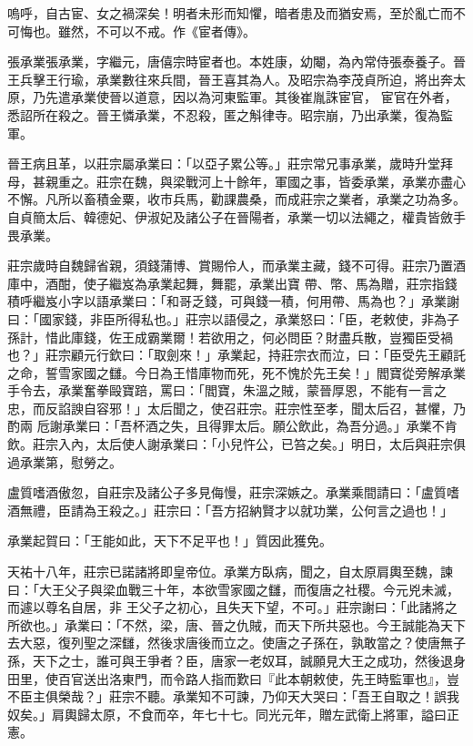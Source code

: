 
\begin{pinyinscope}

 嗚呼，自古宦、女之禍深矣！明者未形而知懼，暗者患及而猶安焉，至於亂亡而不可悔也。雖然，不可以不戒。作《宦者傳》。



 張承業張承業，字繼元，唐僖宗時宦者也。本姓康，幼閹，為內常侍張泰養子。晉王兵擊王行瑜，承業數往來兵間，晉王喜其為人。及昭宗為李茂貞所迫，將出奔太原，乃先遣承業使晉以道意，因以為河東監軍。其後崔胤誅宦官，
 宦官在外者，悉詔所在殺之。晉王憐承業，不忍殺，匿之斛律寺。昭宗崩，乃出承業，復為監軍。



 晉王病且革，以莊宗屬承業曰：「以亞子累公等。」莊宗常兄事承業，歲時升堂拜母，甚親重之。莊宗在魏，與梁戰河上十餘年，軍國之事，皆委承業，承業亦盡心不懈。凡所以畜積金粟，收市兵馬，勸課農桑，而成莊宗之業者，承業之功為多。自貞簡太后、韓德妃、伊淑妃及諸公子在晉陽者，承業一切以法繩之，權貴皆斂手畏承業。



 莊宗歲時自魏歸省親，須錢蒲博、賞賜伶人，而承業主藏，錢不可得。莊宗乃置酒庫中，酒酣，使子繼岌為承業起舞，舞罷，承業出寶
 帶、幣、馬為贈，莊宗指錢積呼繼岌小字以語承業曰：「和哥乏錢，可與錢一積，何用帶、馬為也？」承業謝曰：「國家錢，非臣所得私也。」莊宗以語侵之，承業怒曰：「臣，老敕使，非為子孫計，惜此庫錢，佐王成霸業爾！若欲用之，何必問臣？財盡兵散，豈獨臣受禍也？」莊宗顧元行欽曰：「取劍來！」承業起，持莊宗衣而泣，曰：「臣受先王顧託之命，誓雪家國之讎。今日為王惜庫物而死，死不愧於先王矣！」閻寶從旁解承業手令去，承業奮拳毆寶踣，罵曰：「閻寶，朱溫之賊，蒙晉厚恩，不能有一言之忠，而反諂諛自容邪！」太后聞之，使召莊宗。莊宗性至孝，聞太后召，甚懼，乃酌兩
 卮謝承業曰：「吾杯酒之失，且得罪太后。願公飲此，為吾分過。」承業不肯飲。莊宗入內，太后使人謝承業曰：「小兒忤公，已笞之矣。」明日，太后與莊宗俱過承業第，慰勞之。



 盧質嗜酒傲忽，自莊宗及諸公子多見侮慢，莊宗深嫉之。承業乘間請曰：「盧質嗜酒無禮，臣請為王殺之。」莊宗曰：「吾方招納賢才以就功業，公何言之過也！」



 承業起賀曰：「王能如此，天下不足平也！」質因此獲免。



 天祐十八年，莊宗已諾諸將即皇帝位。承業方臥病，聞之，自太原肩輿至魏，諫曰：「大王父子與梁血戰三十年，本欲雪家國之讎，而復唐之社稷。今元兇未滅，而遽以尊名自居，非
 王父子之初心，且失天下望，不可。」莊宗謝曰：「此諸將之所欲也。」承業曰：「不然，梁，唐、晉之仇賊，而天下所共惡也。今王誠能為天下去大惡，復列聖之深讎，然後求唐後而立之。使唐之子孫在，孰敢當之？使唐無子孫，天下之士，誰可與王爭者？臣，唐家一老奴耳，誠願見大王之成功，然後退身田里，使百官送出洛東門，而令路人指而歎曰『此本朝敕使，先王時監軍也』，豈不臣主俱榮哉？」莊宗不聽。承業知不可諫，乃仰天大哭曰：「吾王自取之！誤我奴矣。」肩輿歸太原，不食而卒，年七十七。同光元年，贈左武衛上將軍，謚曰正憲。




\end{pinyinscope}
